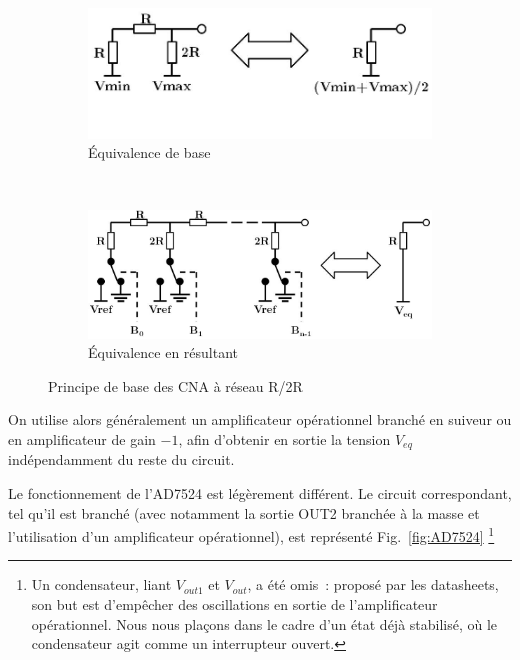 \documentclass{article}
\begin{document}
\begin{figure}[h]
  \centering
  \begin{subfigure}[b]{0.43\textwidth}
    \centering
    \includegraphics[width=\textwidth]{R2Rbasics}
    \caption{Équivalence de base}
    \label{fig:R2Rbase1}
  \end{subfigure}
  ~~~~
  \begin{subfigure}[b]{0.53\textwidth}
    \centering
    \includegraphics[width=\textwidth]{R2Rexpended}
    \caption{Équivalence en résultant}
    \label{fig:R2Rbase2}
  \end{subfigure}
  \caption{Principe de base des CNA à réseau R/2R}
\end{figure}

On utilise alors généralement un amplificateur opérationnel branché en suiveur ou en amplificateur de gain $-1$, afin d'obtenir en sortie la tension $V_{eq}$ indépendamment du reste du circuit.


Le fonctionnement de l'AD7524 est légèrement différent. Le circuit correspondant, tel qu'il est branché (avec notamment la sortie OUT2 branchée à la masse et l'utilisation d'un amplificateur opérationnel), est représenté Fig.~\ref{fig:AD7524} \footnote{Un condensateur, liant $V_{out1}$ et $V_{out}$, a été omis~: proposé par les datasheets, son but est d'empêcher des oscillations en sortie de l'amplificateur opérationnel. Nous nous plaçons dans le cadre d'un état déjà stabilisé, où le condensateur agit comme un interrupteur ouvert.}
\end{document}
